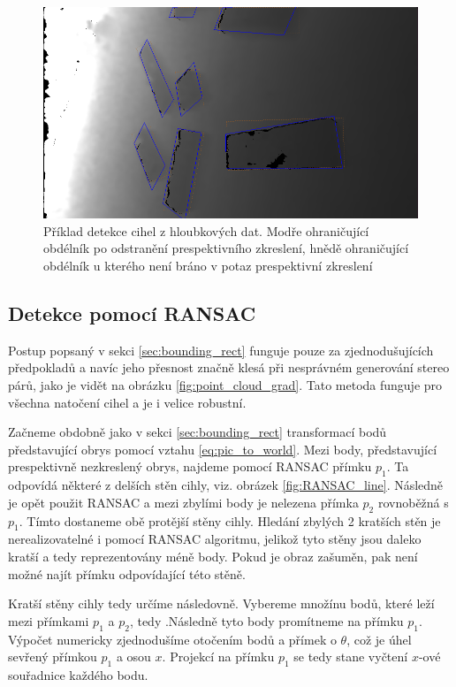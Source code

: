 \documentclass[twoside]{ctuthesis}
\begin{document}
\begin{figure}
    \centering
    \includegraphics[width = 0.7\linewidth]{pictures/detekce_bb.png}
    \caption{Příklad detekce cihel z hloubkových dat. Modře ohraničující obdélník po odstranění prespektivního zkreslení, hnědě ohraničující obdélník u kterého není bráno v potaz prespektivní zkreslení}
    \label{fig:bb_clasic}
\end{figure}

\subsection{Detekce pomocí RANSAC}
\label{sec:ransac_det}
Postup popsaný v sekci \ref{sec:bounding_rect} funguje pouze za zjednodušujících předpokladů a navíc jeho přesnost značně klesá při nesprávném generování stereo párů, jako je vidět na obrázku \ref{fig:point_cloud_grad}. Tato metoda funguje pro všechna natočení cihel a je i velice robustní.

Začneme obdobně jako v sekci \ref{sec:bounding_rect} transformací bodů představující obrys pomocí vztahu \ref{eq:pic_to_world}. Mezi body, představující prespektivně nezkreslený obrys, najdeme pomocí RANSAC přímku $p_1$. Ta odpovídá některé z delších stěn cihly, viz. obrázek \ref{fig:RANSAC_line}. Následně je opět použit RANSAC a mezi zbylími body je nelezena přímka $p_2$ rovnoběžná s $p_1$. Tímto dostaneme obě protější stěny cihly. Hledání zbylých 2 kratších stěn je nerealizovatelné i pomocí RANSAC algoritmu, jelikož tyto stěny jsou daleko kratší a tedy reprezentovány méně body. Pokud je obraz zašuměn, pak není možné najít přímku odpovídající této stěně.

Kratší stěny cihly tedy určíme následovně. Vybereme množínu bodů, které leží mezi přímkami $p_1$ a $p_2$, tedy .Následně tyto body promítneme na přímku $p_1$. Výpočet numericky zjednodušíme otočením bodů a přímek o $\theta$, což je úhel sevřený přímkou $p_1$ a osou $x$. Projekcí na přímku $p_1$ se tedy stane vyčtení $x$-ové souřadnice každého bodu.
\end{document}
